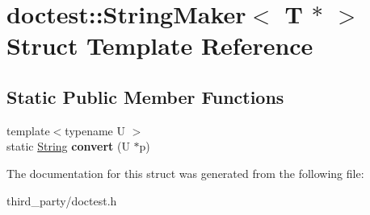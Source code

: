 \hypertarget{structdoctest_1_1_string_maker_3_01_t_01_5_01_4}{}\section{doctest\+::String\+Maker$<$ T $\ast$ $>$ Struct Template Reference}
\label{structdoctest_1_1_string_maker_3_01_t_01_5_01_4}
\subsection*{Static Public Member Functions}
\begin{DoxyCompactItemize}
\item 
\mbox{\label{structdoctest_1_1_string_maker_3_01_t_01_5_01_4_a79dfd2e72f48a1d9941b924d6ac23104}} 
{\footnotesize template$<$typename U $>$ }\\static \mbox{\hyperlink{classdoctest_1_1_string}{String}} {\bfseries convert} (U $\ast$p)
\end{DoxyCompactItemize}


The documentation for this struct was generated from the following file\+:\begin{DoxyCompactItemize}
\item 
third\+\_\+party/doctest.\+h\end{DoxyCompactItemize}
